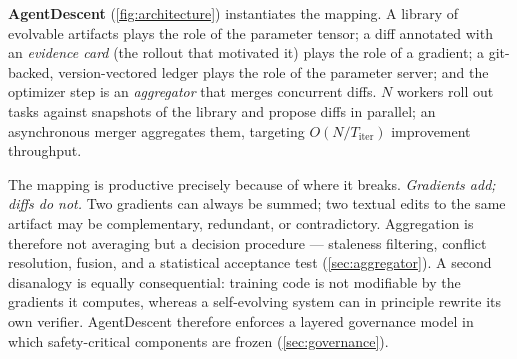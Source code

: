 \documentclass{article}
\begin{document}
\textbf{AgentDescent} (\cref{fig:architecture}) instantiates the mapping. A library of evolvable artifacts plays the role of the parameter tensor; a diff annotated with an \emph{evidence card} (the rollout that motivated it) plays the role of a gradient; a git-backed, version-vectored ledger plays the role of the parameter server; and the optimizer step is an \emph{aggregator} that merges concurrent diffs. $N$ workers roll out tasks against snapshots of the library and propose diffs in parallel; an asynchronous merger aggregates them, targeting $O(N/T_{\mathrm{iter}})$ improvement throughput.

The mapping is productive precisely because of where it breaks. \emph{Gradients add; diffs do not.} Two gradients can always be summed; two textual edits to the same artifact may be complementary, redundant, or contradictory. Aggregation is therefore not averaging but a decision procedure --- staleness filtering, conflict resolution, fusion, and a statistical acceptance test (\cref{sec:aggregator}). A second disanalogy is equally consequential: training code is not modifiable by the gradients it computes, whereas a self-evolving system can in principle rewrite its own verifier. AgentDescent therefore enforces a layered governance model in which safety-critical components are frozen (\cref{sec:governance}).
\end{document}
